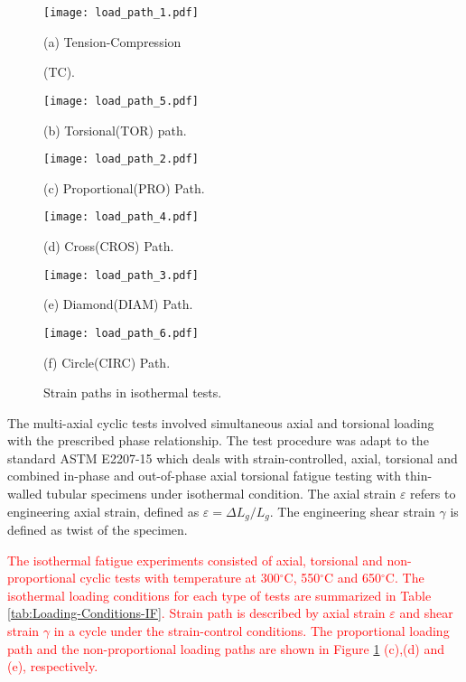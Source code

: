 \documentclass[preprint,5p,twocolumn,11pt,sort&compress]{elsarticle}
\newcommand{\marked}[1]{\textcolor{red}{#1}}
\begin{document}
\begin{figure}
  \begin{minipage}[t]{0.5\linewidth}
  \nonumber
    \centering
    \texttt{[image: load\_path\_1.pdf]}
    \centerline{\small (a) Tension-Compression}
    \centerline{\small (TC).}
  \end{minipage}%
  \begin{minipage}[t]{0.5\linewidth}
    \centering
    \texttt{[image: load\_path\_5.pdf]}
    \centerline{\small (b) Torsional(TOR) path.}
  \end{minipage}
  \begin{minipage}[t]{0.5\linewidth}
  \nonumber
    \centering
    \texttt{[image: load\_path\_2.pdf]}
    \centerline{\small (c) Proportional(PRO) Path.}
  \end{minipage}%
  \begin{minipage}[t]{0.5\linewidth}
    \centering
    \texttt{[image: load\_path\_4.pdf]}
    \centerline{\small (d) Cross(CROS) Path.}
  \end{minipage}
  \begin{minipage}[t]{0.5\linewidth}
  \nonumber
    \centering
    \texttt{[image: load\_path\_3.pdf]}
    \centerline{\small (e) Diamond(DIAM) Path.}
  \end{minipage}%
  \begin{minipage}[t]{0.5\linewidth}
    \centering
    \texttt{[image: load\_path\_6.pdf]}
    \centerline{\small (f) Circle(CIRC) Path.}
  \end{minipage}
  \caption{Strain paths in isothermal tests.}
  \label{Fig:LoadPath}
\end{figure}

The multi-axial cyclic tests involved simultaneous axial and torsional loading with the prescribed phase relationship.
The test procedure was adapt to the standard ASTM E2207-15 which deals with strain-controlled, axial, torsional and combined in-phase and out-of-phase axial torsional fatigue testing with thin-walled tubular specimens under isothermal condition.
The axial strain $\varepsilon$ refers to engineering axial strain, defined as $\varepsilon=\Delta L_g/L_g$. The engineering shear strain $\gamma$ is defined as twist of the specimen.

\marked{The isothermal fatigue experiments consisted of axial, torsional and non-proportional cyclic tests with temperature at 300$^{\circ}$C, 550$^{\circ}$C and 650$^{\circ}$C. The isothermal loading conditions for each type of tests are summarized in Table \ref{tab:Loading-Conditions-IF}.
Strain path is described by axial strain $\varepsilon$ and shear strain $\gamma$ in a cycle under the strain-control conditions. The proportional loading path and the non-proportional loading paths are shown in Figure \ref{Fig:LoadPath} (c),(d) and (e), respectively.}
\end{document}
